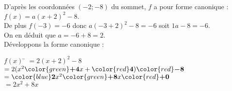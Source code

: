 \documentclass[a4paper,11pt,exos]{nsi} %
\begin{document}
D'après les coordonnées $(-2;-8)$ du sommet, $f$ a pour forme canonique : $f(x)=a(x+2)^2-8$.\\
De plus $f(-3)=-6$ donc $a(-3+2)^2-8=-6$ soit $1a-8=-6$.\\On en déduit que $a=-6+8=2$.\\Développons la forme canonique : 
\begin{tabbing}
    $f(x)$  \=  $=2(x+2)^2-8$\\
    \>  $=2(x^2{\color{green}\boldsymbol{+4}}x+{\color{red}\boldsymbol{4}}){\color{red}\boldsymbol{-8}}$\\
    \>  $={\color{blue}\boldsymbol{2}}x^2{\color{green}\boldsymbol{+8}}x{\color{red}\boldsymbol{+0}}$\\
    \> $=2x^2+8x$
\end{tabbing}
\end{document}
